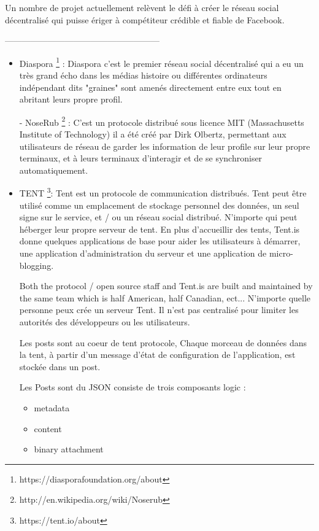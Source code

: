 Un nombre de projet actuellement relèvent le défi à créer le réseau social décentralisé qui puisse ériger à compétiteur crédible et fiable de Facebook.
  \begin{center}
------------------------------------------------------
\end{center}
\begin{itemize}
  \item Diaspora \footnote{https://diasporafoundation.org/about} : \newline
Diaspora c'est le premier réseau social décentralisé qui a eu un très grand écho dans les médias histoire ou différentes ordinateurs indépendant dits "graines" sont amenés directement entre eux tout en abritant leurs propre profil.

- NoseRub \footnote{http://en.wikipedia.org/wiki/Noserub} : C'est un protocole distribué sous licence MIT (Massachusetts Institute of Technology) 
il a été créé par Dirk Olbertz, permettant aux utilisateurs de réseau de garder les information de leur profile sur leur propre terminaux, et à leurs terminaux d'interagir et de se synchroniser automatiquement.
  \item TENT \footnote{https://tent.io/about}: \newline
Tent est un protocole de communication distribués. Tent peut être utilisé comme un emplacement de stockage personnel des données, un seul signe sur le service, et / ou un réseau social distribué. N'importe qui peut héberger leur propre serveur de tent. En plus d'accueillir des tents, Tent.is donne quelques applications de base pour aider les utilisateurs à démarrer, une application d'administration du serveur et une application de micro-blogging.

Both the protocol / open source staff and Tent.is are built and maintained by the same team which is half American, half Canadian, ect...
N'importe quelle personne peux crée un serveur Tent. Il n'est pas centralisé pour limiter les autorités des développeurs ou les utilisateurs.

Les posts sont au coeur de tent protocole, Chaque morceau de données dans la tent, à partir d'un message d'état de configuration de l'application, est stockée dans un post.

Les Posts sont du JSON consiste de trois composants logic :
\begin{itemize}
  \item metadata 
 \item content 
 \item binary attachment
\end{itemize}


\end{itemize}
